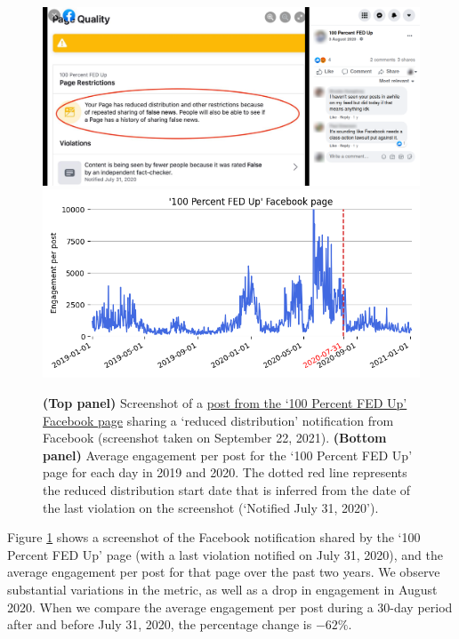 \documentclass[review]{elsarticle}
\begin{document}
{{\begin{figure}[!h]
\centering
\includegraphics[scale=0.15]{./../figure/reduce_example_screenshot.png}
\includegraphics[scale=0.5]{./../figure/reduce_example_timeseries.png}
\caption{
{\bf(Top panel)} Screenshot of a \href{https://www.facebook.com/100PercentFEDUp/photos/a.330374477016724/3201797096541100}{post from the `100 Percent FED Up' Facebook page} sharing a `reduced distribution' notification from Facebook (screenshot taken on September 22, 2021). 
{\bf(Bottom panel)} Average engagement per post for the `100 Percent FED Up' page for each day in 2019 and 2020.
The dotted red line represents the reduced distribution start date that is inferred from the date of the last violation on the screenshot (`Notified July 31, 2020').
}
\label{reduce_example}
\end{figure}

Figure \ref{reduce_example} shows a screenshot of the Facebook notification shared by the `100 Percent FED Up' page (with a last violation notified on July 31, 2020), and the average engagement per post for that page over the past two years. 
We observe substantial variations in the metric, as well as a drop in engagement in August 2020. 
When we compare the average engagement per post during a 30-day period after and before July 31, 2020, the percentage change is $-62\%$.

}}
\end{document}
